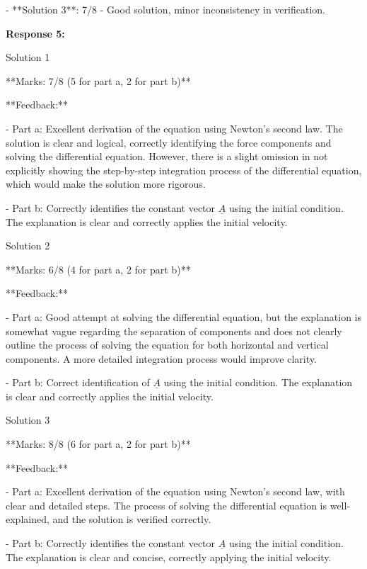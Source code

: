 \documentclass[a4paper,11pt]{article}
\begin{document}
- **Solution 3**: 7/8 - Good solution, minor inconsistency in verification.

\bigskip
\textbf{Response 5:}

Solution 1

**Marks: 7/8 (5 for part a, 2 for part b)**

**Feedback:**

- Part a: Excellent derivation of the equation using Newton's second law. The solution is clear and logical, correctly identifying the force components and solving the differential equation. However, there is a slight omission in not explicitly showing the step-by-step integration process of the differential equation, which would make the solution more rigorous.

- Part b: Correctly identifies the constant vector \(\underline{A}\) using the initial condition. The explanation is clear and correctly applies the initial velocity.

Solution 2

**Marks: 6/8 (4 for part a, 2 for part b)**

**Feedback:**

- Part a: Good attempt at solving the differential equation, but the explanation is somewhat vague regarding the separation of components and does not clearly outline the process of solving the equation for both horizontal and vertical components. A more detailed integration process would improve clarity.

- Part b: Correct identification of \(\underline{A}\) using the initial condition. The explanation is clear and correctly applies the initial velocity.

Solution 3

**Marks: 8/8 (6 for part a, 2 for part b)**

**Feedback:**

- Part a: Excellent derivation of the equation using Newton's second law, with clear and detailed steps. The process of solving the differential equation is well-explained, and the solution is verified correctly.

- Part b: Correctly identifies the constant vector \(\underline{A}\) using the initial condition. The explanation is clear and concise, correctly applying the initial velocity.
\end{document}
